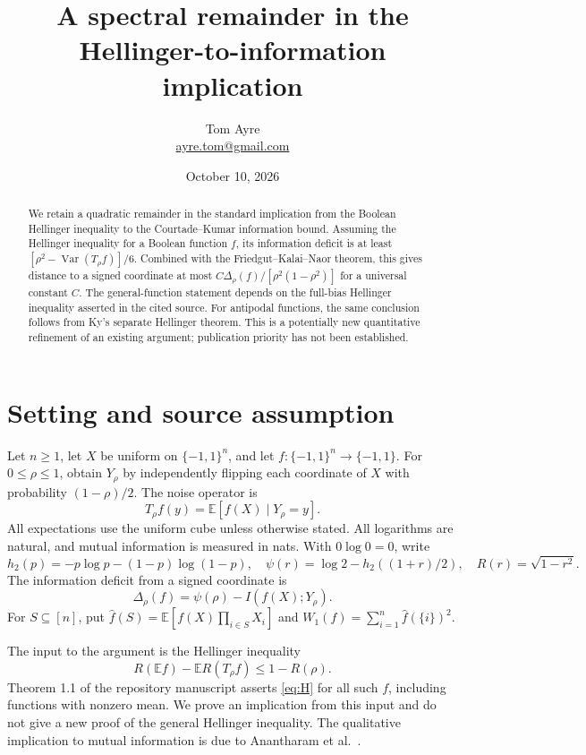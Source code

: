 \documentclass[11pt]{article}
\title{A spectral remainder in the\\Hellinger-to-information implication}
\author{Tom Ayre\\\small\href{mailto:ayre.tom@gmail.com}{ayre.tom@gmail.com}}
\date{October 10, 2026}
\newcommand{\E}{\mathbb E}
\newcommand{\Var}{\operatorname{Var}}
\begin{document}
\maketitle

\begin{abstract}
We retain a quadratic remainder in the standard implication from the
Boolean Hellinger inequality to the Courtade--Kumar information bound.
Assuming the Hellinger inequality for a Boolean function $f$, its
information deficit is at least
$[\rho^2-\Var(T_\rho f)]/6$. Combined with the
Friedgut--Kalai--Naor theorem, this gives distance to a signed coordinate
at most $C\Delta_\rho(f)/[\rho^2(1-\rho^2)]$ for a universal constant $C$.
The general-function statement depends on the full-bias Hellinger
inequality asserted in the cited source. For antipodal functions, the
same conclusion follows from Ky's separate Hellinger theorem.
This is a potentially new quantitative refinement of an existing
argument; publication priority has not been established.
\end{abstract}

\section{Setting and source assumption}
Let $n\ge1$, let $X$ be uniform on $\{-1,1\}^n$, and let
$f:\{-1,1\}^n\to\{-1,1\}$. For $0\le\rho\le1$, obtain $Y_\rho$
by independently flipping each coordinate of $X$ with probability
$(1-\rho)/2$. The noise operator is
\[
 T_\rho f(y)=\E[f(X)\mid Y_\rho=y].
\]
All expectations use the uniform cube unless otherwise stated.
All logarithms are natural, and mutual information is measured in nats.
With $0\log0=0$, write
\[
 h_2(p)=-p\log p-(1-p)\log(1-p),\quad
 \psi(r)=\log2-h_2((1+r)/2),\quad R(r)=\sqrt{1-r^2}.
\]
The information deficit from a signed coordinate is
\[
 \Delta_\rho(f)=\psi(\rho)-I(f(X);Y_\rho).
\]
For $S\subseteq[n]$, put
$\widehat f(S)=\E[f(X)\prod_{i\in S}X_i]$ and
$W_1(f)=\sum_{i=1}^n\widehat f(\{i\})^2$.

The input to the argument is the Hellinger inequality
\begin{equation}\label{eq:H}
 R(\E f)-\E R(T_\rho f)\le1-R(\rho).
 \tag{H}
\end{equation}
Theorem 1.1 of the repository manuscript \cite{source} asserts
\eqref{eq:H} for all such $f$, including functions with nonzero mean.
We prove an implication from this input and do not give a new proof
of the general Hellinger inequality. The qualitative implication to
mutual information is due to Anantharam et al.\ \cite{ABCJN}.
\end{document}
